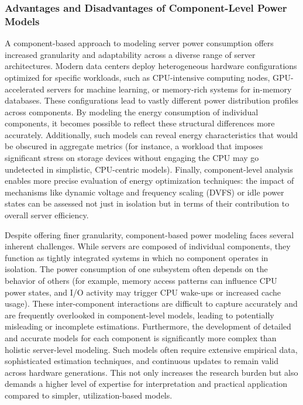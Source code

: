 \subsubsection{Advantages and Disadvantages of Component-Level Power Models}

A component-based approach to modeling server power consumption offers increased granularity and adaptability across a diverse range of server architectures. Modern data centers deploy heterogeneous hardware configurations optimized for specific workloads, such as CPU-intensive computing nodes, GPU-accelerated servers for machine learning, or memory-rich systems for in-memory databases. These configurations lead to vastly different power distribution profiles across components\parencite{katalEnergyEfficiencyCloud2022}. By modeling the energy consumption of individual components, it becomes possible to reflect these structural differences more accurately. Additionally, such models can reveal energy characteristics that would be obscured in aggregate metrics (for instance, a workload that imposes significant stress on storage devices without engaging the CPU may go undetected in simplistic, CPU-centric models). Finally, component-level analysis enables more precise evaluation of energy optimization techniques: the impact of mechanisms like dynamic voltage and frequency scaling (DVFS) or idle power states can be assessed not just in isolation but in terms of their contribution to overall server efficiency.

Despite offering finer granularity, component-based power modeling faces several inherent challenges. While servers are composed of individual components, they function as tightly integrated systems in which no component operates in isolation. The power consumption of one subsystem often depends on the behavior of others (for example, memory access patterns can influence CPU power states, and I/O activity may trigger CPU wake-ups or increased cache usage). These inter-component interactions are difficult to capture accurately and are frequently overlooked in component-level models\parencite{lin2020taxonomy}, leading to potentially misleading or incomplete estimations. Furthermore, the development of detailed and accurate models for each component is significantly more complex than holistic server-level modeling. Such models often require extensive empirical data, sophisticated estimation techniques, and continuous updates to remain valid across hardware generations. This not only increases the research burden but also demands a higher level of expertise for interpretation and practical application compared to simpler, utilization-based models.

